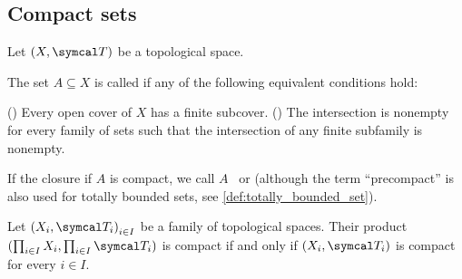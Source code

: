\subsection{Compact sets}\label{subsec:compact_sets}

Let \( (X, \Cal{T}) \) be a topological space.

\begin{definition}\label{def:compact_set}\cite[40]{Deimling1985}
  The set \( A \subseteq X \) is called  if any of the following equivalent conditions hold:
  \begin{defenum}
     () Every open cover of \( X \) has a finite subcover.
     () The intersection is nonempty for every family of sets such that the intersection of any finite subfamily is nonempty.
  \end{defenum}

  If the closure if \( A \) is compact, we call \( A \)~ or  (although the term \enquote{precompact} is also used for totally bounded sets, see \ref{def:totally_bounded_set}).
\end{definition}

\begin{theorem}\label{thm:tychonoffs_product_theorem}\cite[theorem 3.2.4]{Engelking1989}
  Let \( { (X_i, \Cal{T}_i) }_{i \in I} \) be a family of topological spaces. Their product \( (\prod_{i \in I} X_i, \prod_{i \in I} \Cal{T}_i) \) is compact if and only if \( (X_i, \Cal{T}_i) \) is compact for every \( i \in I \).

\end{theorem}
